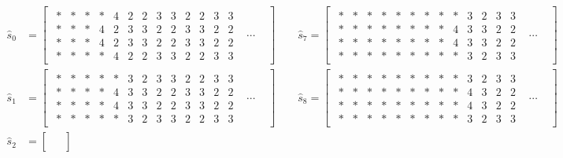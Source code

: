 \documentclass[aap]{imsart}
\begin{document}
\begin{align*}
\hat{s}_0 &= 
\begin{bmatrix}
\begin{smallmatrix}
* & * & * & * & 4 & 2 & 2 & 3 & 3 & 2 & 2 & 3  & 3 \\
 * & * & * & 4 & 2 & 3 & 3 & 2 & 2 & 3 & 3 & 2 & 2 \\
  * & * & * & 4 & 2 & 3 & 3 & 2 & 2 & 3 & 3 & 2 & 2 \\ 
  * & * & * & * & 4 & 2 & 2 & 3 & 3 & 2 & 2 & 3 & 3
\end{smallmatrix}
& 
\cdots
&
\end{bmatrix}
\qquad
\hat{s}_7 = 
\begin{bmatrix}
\begin{smallmatrix}
* & * & * & * & * & * & * & * & * & 3 & 2 & 3 & 3 \\
 * & * & * & * & * & * & * & * & 4 & 3 & 3 & 2 & 2  \\
  * & * & * & * & * & * & * & * & 4 & 3 & 3 & 2 & 2 \\
   * & * & * & * & * & * & * & * & * & 3 & 2 & 3 & 3
\end{smallmatrix}
& 
\cdots
&
\end{bmatrix} \\
\hat{s}_1 &= 
\begin{bmatrix}
\begin{smallmatrix}
* & * & * & * & * & 3 & 2 & 3 & 3 & 2 & 2 & 3 & 3 \\ 
* & * & * & * & 4 & 3 & 3 & 2 & 2 & 3 & 3 & 2 & 2 \\
 * & * & * & * & 4 & 3 & 3 & 2 & 2 & 3 & 3 & 2 & 2 \\
  * & * & * & * & * & 3 & 2 & 3 & 3 & 2 & 2 & 3 & 3
\end{smallmatrix}
& 
\cdots
&
\end{bmatrix} 
\qquad \hat{s}_8 =
\begin{bmatrix}
\begin{smallmatrix}
* & * & * & * & * & * & * & * & * & 3 & 2 & 3 & 3 \\ 
* & * & * & * & * & * & * & * & * & 4 & 3 & 2 & 2 \\ 
* & * & * & * & * & * & * & * & * & 4 & 3 & 2 & 2 \\ 
* & * & * & * & * & * & * & * & * & 3 & 2 & 3 & 3
\end{smallmatrix}
& 
\cdots
&
\end{bmatrix} \\
\hat{s}_2 &= 
\begin{bmatrix}
\begin{smallmatrix}

\end{smallmatrix}
\end{bmatrix}
\end{align*}
\end{document}
